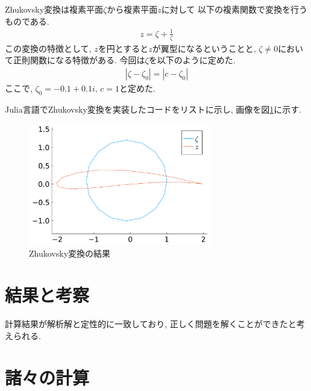 \documentclass{ltjsarticle}
\begin{document}
Zhukovsky変換は複素平面$\zeta$から複素平面$z$に対して
以下の複素関数で変換を行うものである.
\begin{align}
    z = \zeta +\frac{1}{\zeta}
\end{align}
この変換の特徴として, $z$を円とすると$z$が翼型になるということと,
$\zeta\neq 0$において正則関数になる特徴がある.
今回は$\zeta$を以下のように定めた.
\begin{align}
    |\zeta- \zeta_0| = |c-\zeta_0|
\end{align}
ここで, $\zeta_0 = -0.1+0.1i$, $c=1$と定めた.

Julia言語でZhukovsky変換を実装したコードをリストに示し, 
画像を図\ref{fig:zhukovsky}に示す.
\begin{figure}[htbp]
    \centering
    \includegraphics[width=8cm]{ZhukovskyWing.pdf}
    \caption{Zhukovsky変換の結果}
    \label{fig:zhukovsky}
\end{figure}

\section{結果と考察}
計算結果が解析解と定性的に一致しており, 正しく問題を解くことができたと考えられる.

\clearpage
\printbibliography[title=参考文献]

\appendix
\section{諸々の計算}
\end{document}
